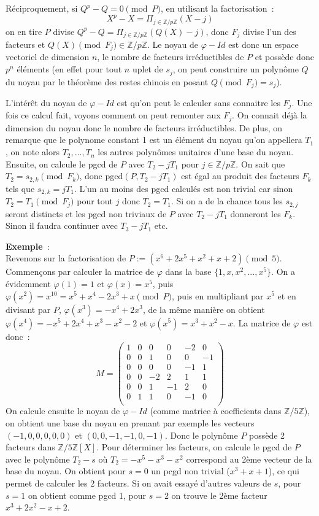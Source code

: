 \documentclass[a4paper,11pt]{article}
\newcommand{\Z}{{\mathbb{Z}}}
\begin{document}
Réciproquement, si
$Q^p-Q=0 \pmod P$, en utilisant la factorisation~:
\[ X^p-X= \Pi_{j \in \Z/p\Z } (X-j)\]
on en tire $P$ divise $Q^p-Q=\Pi_{j \in \Z/p\Z } (Q(X)-j)$,
donc $F_j$ divise l'un des facteurs et $Q(X) \pmod {F_j} \in \Z/p\Z$.
Le noyau de $\varphi -Id$
est donc un espace vectoriel de dimension $n$, le nombre
de facteurs irréductibles de $P$ et possède donc $p^n$ éléments
(en effet pour tout $n$ uplet de $s_j$, on peut construire un polynôme
$Q$ du noyau par le théorème des restes chinois en posant $Q\pmod {F_j}=s_j$).

L'intérêt du noyau de $\varphi-Id$ est qu'on peut le calculer sans connaitre
les $F_j$. Une fois ce calcul fait, voyons comment on peut remonter 
aux $F_j$. On connait déjà la dimension du noyau donc le nombre de facteurs
irréductibles. De plus, on remarque que le polynome constant 1 est un
élément du noyau qu'on appellera $T_1$, on note alors $T_2,...,T_n$ les
autres polynômes unitaires d'une base du noyau. 
Ensuite, on calcule le pgcd de $P$ avec $T_2-jT_1$
pour $j\in \Z/p\Z$. On sait que $T_2=s_{2,k} \pmod {F_k}$, donc pgcd$(P,T_2-jT_1)$
est égal au produit des facteurs $F_k$ tels que $s_{2,k}=jT_1$. L'un au moins
des pgcd calculés est non trivial car sinon $T_2=T_1 \pmod{F_j}$ pour
tout $j$ donc $T_2=T_1$. Si on a de la chance tous les $s_{2,j}$ seront
distincts et les pgcd non triviaux de $P$ avec $T_2-jT_1$ donneront les $F_k$.
Sinon il faudra continuer avec $T_3-jT_1$ etc.

{\bf Exemple}~:\\
Revenons sur la factorisation de $P:=(x^6+2x^5+x^2+x+2) \pmod 5$.
Commençons par calculer la matrice de $\varphi$ dans la base
$\{ 1,x,x^2,...,x^5\}$. On a évidemment $\varphi(1)=1$ et
$\varphi(x)=x^5$, puis $\varphi(x^2)=x^{10}=x^5+x^4-2x^3+x \pmod P$,
puis en multipliant par $x^5$ et en divisant par $P$,
$\varphi(x^3)=-x^4+2x^3$, de la même manière on obtient 
$\varphi(x^4)=-x^5+2x^4+x^3-x^2-2$ et $\varphi(x^5)=x^3+x^2-x$.
La matrice de $\varphi$ est donc~:
\[ M=\left( 
\begin{array}{cccccc}
1& 0& 0 &0 &-2&0\\
0& 0& 1 &0 &0 &-1\\
0& 0& 0 &0 &-1&1\\
0& 0& -2&2 & 1&1\\
0& 0& 1 &-1& 2&0\\
0& 1& 1 &0 &-1&0\\
\end{array}
\right)\]
On calcule ensuite le noyau de $\varphi-Id$ (comme matrice à coefficients
dans $\Z/5\Z$), on obtient une
base du noyau en prenant par exemple les vecteurs $(-1,0,0,0,0,0)$
et $(0,0,-1,-1,0,-1)$. Donc le polynôme $P$ possède 2 facteurs dans
$\Z/5\Z[X]$. Pour déterminer les facteurs, on calcule le pgcd de $P$
avec le polynôme $T_2-s$ où $T_2=-x^5-x^3-x^2$ correspond au 2ème
vecteur de la base du noyau. On obtient pour $s=0$ un pcgd non trivial
($x^3+x+1$), ce qui permet de calculer les 2 facteurs. Si on avait
essayé d'autres valeurs de $s$, pour $s=1$ on obtient comme pgcd 1, pour
$s=2$ on trouve le 2ème facteur $x^3+2x^2-x+2$.
\end{document}
